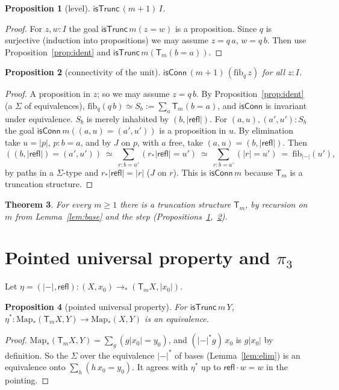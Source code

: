 \documentclass[11pt]{amsart}
\newtheorem{theorem}{Theorem}
\newtheorem{proposition}[theorem]{Proposition}
\theoremstyle{definition}
\theoremstyle{remark}
\newcommand{\Map}{\mathrm{Map}_*}
\newcommand{\fib}{\mathrm{fib}}
\newcommand{\Tr}[1]{\mathsf{T}_{#1}}
\newcommand{\un}[1]{|#1|}
\newcommand{\cT}{\mathsf{isTrunc}}
\newcommand{\cC}{\mathsf{isConn}}
\begin{document}
\begin{proposition}[level]\label{prop:level}
$\cT\,(m+1)\,I$.
\end{proposition}
\begin{proof}
For $z,w:I$ the goal $\cT\,m(z=w)$ is a proposition. Since $q$ is
surjective (induction into propositions) we may assume $z=q\,a$, $w=q\,b$.
Then use Proposition~\ref{prop:ident} and $\cT\,m(\Tr m(b=a))$.
\end{proof}

\begin{proposition}[connectivity of the unit]\label{prop:conn}
$\cC\,(m+1)\,(\fib_q\,z)$ for all $z:I$.
\end{proposition}
\begin{proof}
A proposition in $z$; so we may assume $z=q\,b$. By
Proposition~\ref{prop:ident} (a $\Sigma$ of equivalences),
$\fib_q(q\,b)\simeq S_b:=\sum_a\Tr m(b=a)$, and $\cC$ is invariant under
equivalence. $S_b$ is merely inhabited by $(b,\un{\mathsf{refl}})$. For
$(a,u),(a',u'):S_b$ the goal $\cC\,m((a,u)=(a',u'))$ is a proposition in
$u$. By elimination take $u=\un p$, $p:b=a$, and by $J$ on $p$, with
$a$ free, take $(a,u)=(b,\un{\mathsf{refl}})$. Then
\[ ((b,\un{\mathsf{refl}})=(a',u'))\ \simeq\ \textstyle\sum_{r:b=a'}(r_*\un{\mathsf{refl}}=u')
   \ \simeq\ \sum_{r:b=a'}(\un r=u')\ =\ \fib_{\un-}(u'), \]
by paths in a $\Sigma$-type and $r_*\un{\mathsf{refl}}=\un r$ ($J$ on
$r$). This is $\cC\,m$ because $\Tr m$ is a truncation structure.
\end{proof}

\begin{theorem}\label{thm:trunc}
For every $m\ge1$ there is a truncation structure $\Tr m$, by recursion on
$m$ from Lemma~\ref{lem:base} and the step
(Propositions~\ref{prop:level},~\ref{prop:conn}).
\end{theorem}

\section{Pointed universal property and $\pi_3$}

Let $\eta=(\un-,\mathsf{refl}):(X,x_0)\to_*(\Tr mX,\un{x_0})$.

\begin{proposition}[pointed universal property]\label{prop:ptup}
For $\cT\,m\,Y$, $\eta^*:\Map(\Tr mX,Y)\to\Map(X,Y)$ is an equivalence.
\end{proposition}
\begin{proof}
$\Map(\Tr mX,Y)=\sum_g(g\un{x_0}=y_0)$, and $(\un-^*g)\,x_0$ is
$g\un{x_0}$ by definition. So the $\Sigma$ over the equivalence $\un-^*$
of bases (Lemma~\ref{lem:elim}) is an equivalence onto
$\sum_h(h\,x_0=y_0)$. It agrees with $\eta^*$ up to
$\mathsf{refl}\cdot w=w$ in the pointing.
\end{proof}
\end{document}
